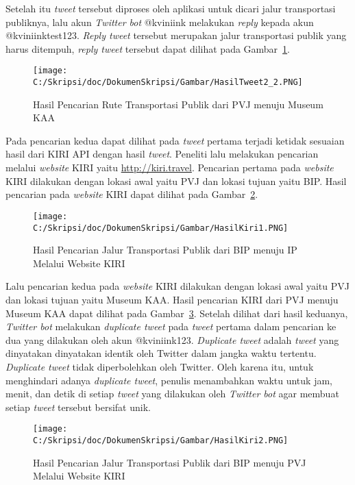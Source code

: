 \begin{enumerate}
	Setelah itu \textit{tweet} tersebut diproses oleh aplikasi untuk dicari jalur transportasi publiknya, lalu akun \textit{Twitter bot} @kviniink melakukan \textit{reply} kepada akun @kviniinktest123. \textit{Reply tweet} tersebut merupakan jalur transportasi publik yang harus ditempuh, \textit{reply tweet} tersebut dapat dilihat pada Gambar~\ref{fig:HasilTweet2_2}.
	
	
	\begin{figure}
		\centering
			\texttt{[image: C:/Skripsi/doc/DokumenSkripsi/Gambar/HasilTweet2\_2.PNG]}
		\caption{Hasil Pencarian Rute Transportasi Publik dari PVJ menuju Museum KAA}
		\label{fig:HasilTweet2_2}
	\end{figure}
	
	Pada pencarian kedua dapat dilihat pada \textit{tweet} pertama terjadi ketidak sesuaian hasil dari KIRI API dengan hasil \textit{tweet}.
	Peneliti lalu melakukan pencarian melalui \textit{website} KIRI yaitu \url{http://kiri.travel}. Pencarian pertama pada \textit{website} KIRI dilakukan dengan lokasi awal yaitu PVJ dan lokasi tujuan yaitu BIP. Hasil pencarian pada \textit{website} KIRI dapat dilihat pada Gambar~\ref{fig:HasilKiri1}.
	
	
	\begin{figure}
		\centering
			\texttt{[image: C:/Skripsi/doc/DokumenSkripsi/Gambar/HasilKiri1.PNG]}
		\caption{Hasil Pencarian Jalur Transportasi Publik dari BIP menuju IP Melalui Website KIRI}
		\label{fig:HasilKiri1}
	\end{figure}
	
	Lalu pencarian kedua pada \textit{website} KIRI dilakukan dengan lokasi awal yaitu PVJ dan lokasi tujuan yaitu Museum KAA. Hasil pencarian KIRI dari PVJ menuju Museum KAA dapat dilihat pada Gambar~\ref{fig:HasilKiri2}. Setelah dilihat dari hasil keduanya, \textit{Twitter bot} melakukan \textit{duplicate tweet} pada \textit{tweet} pertama dalam pencarian ke dua yang dilakukan oleh akun @kviniink123. \textit{Duplicate tweet} adalah \textit{tweet} yang dinyatakan dinyatakan identik oleh Twitter dalam jangka waktu tertentu. \textit{Duplicate tweet} tidak diperbolehkan oleh Twitter. Oleh karena itu, untuk menghindari adanya \textit{duplicate tweet}, penulis menambahkan waktu untuk jam, menit, dan detik di setiap \textit{tweet} yang dilakukan oleh \textit{Twitter bot} agar membuat setiap \textit{tweet} tersebut bersifat unik.
	
	\begin{figure}
		\centering
			\texttt{[image: C:/Skripsi/doc/DokumenSkripsi/Gambar/HasilKiri2.PNG]}
		\caption{Hasil Pencarian Jalur Transportasi Publik dari BIP menuju PVJ Melalui Website KIRI}
		\label{fig:HasilKiri2}
	\end{figure}
	\clearpage
	

\end{enumerate}
